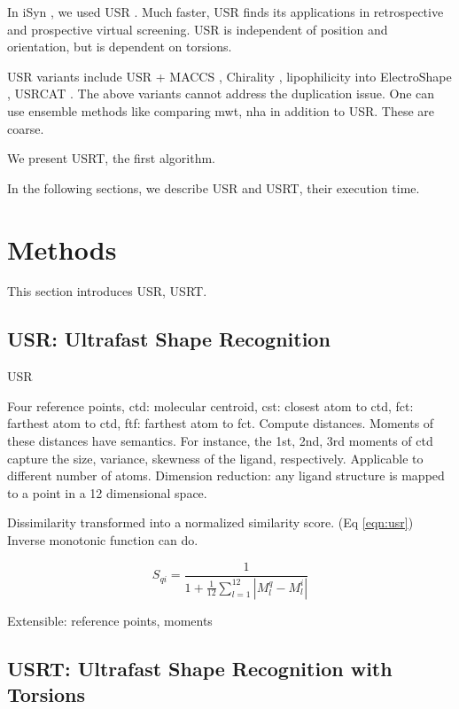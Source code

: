 \documentclass[twocolumn]{svjour3}          %
\begin{document}
In iSyn \cite{1381,1387}, we used USR \cite{1379,1280}. Much faster, USR finds its applications in retrospective \cite{1332} and prospective \cite{1380} virtual screening. USR is independent of position and orientation, but is dependent on torsions.

USR variants include USR + MACCS \cite{1333}, Chirality \cite{1334,1335}, lipophilicity into ElectroShape \cite{1337,1338}, USRCAT \cite{1331}. The above variants cannot address the duplication issue. One can use ensemble methods like comparing mwt, nha in addition to USR. These are coarse.

We present USRT, the first algorithm.

In the following sections, we describe USR and USRT, their execution time.

\section{Methods}
\label{sec:methods}

This section introduces USR, USRT.

\subsection{USR: Ultrafast Shape Recognition}
\label{sec:usr}

USR \cite{1379}

Four reference points, ctd: molecular centroid, cst: closest atom to ctd, fct: farthest atom to ctd, ftf: farthest atom to fct. Compute distances. Moments of these distances have semantics. For instance, the 1st, 2nd, 3rd moments of ctd capture the size, variance, skewness of the ligand, respectively. Applicable to different number of atoms. Dimension reduction: any ligand structure is mapped to a point in a 12 dimensional space.

Dissimilarity transformed into a normalized similarity score. (Eq \ref{eqn:usr}) Inverse monotonic function can do.

\begin{equation}
S_{qi}=\frac{1}{1+\frac{1}{12}\sum_{l=1}^{12}|M_l^q-M_l^i|}
\label{eqn:usr}
\end{equation}

Extensible: reference points, moments

\subsection{USRT: Ultrafast Shape Recognition with Torsions}
\label{sec:usrt}
\end{document}
